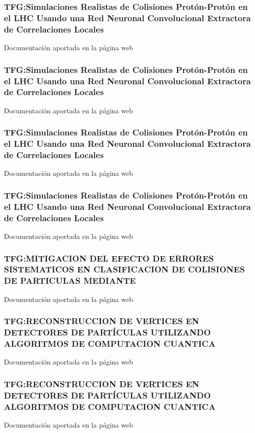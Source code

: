 \documentclass[a4paper, 11pt, twoside, openright]{report}
\begin{document}
\subsubsection{TFG:Simulaciones Realistas de Colisiones Protón-Protón en el LHC Usando una Red Neuronal Convolucional Extractora de Correlaciones Locales}
Documentación aportada en la página web

\subsubsection{TFG:Simulaciones Realistas de Colisiones Protón-Protón en el LHC Usando una Red Neuronal Convolucional Extractora de Correlaciones Locales}
Documentación aportada en la página web

\subsubsection{TFG:Simulaciones Realistas de Colisiones Protón-Protón en el LHC Usando una Red Neuronal Convolucional Extractora de Correlaciones Locales}
Documentación aportada en la página web

\subsubsection{TFG:Simulaciones Realistas de Colisiones Protón-Protón en el LHC Usando una Red Neuronal Convolucional Extractora de Correlaciones Locales}
Documentación aportada en la página web

\subsubsection{TFG:MITIGACION DEL EFECTO DE ERRORES SISTEMATICOS EN CLASIFICACION DE COLISIONES DE PARTICULAS MEDIANTE}
Documentación aportada en la página web

\subsubsection{TFG:RECONSTRUCCION DE VERTICES EN DETECTORES DE PARTÍCULAS UTILIZANDO ALGORITMOS DE COMPUTACION CUANTICA}
Documentación aportada en la página web

\subsubsection{TFG:RECONSTRUCCION DE VERTICES EN DETECTORES DE PARTÍCULAS UTILIZANDO ALGORITMOS DE COMPUTACION CUANTICA}
Documentación aportada en la página web
\end{document}
